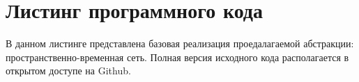 \chapter{Листинг программного кода}\label{app:A}

В данном листинге представлена базовая реализация проедалагаемой абстракции: пространственно-временная сеть. Полная версия исходного кода располагается в открытом доступе на Github.

\begingroup
\captiondelim{ } %
    
\endgroup
